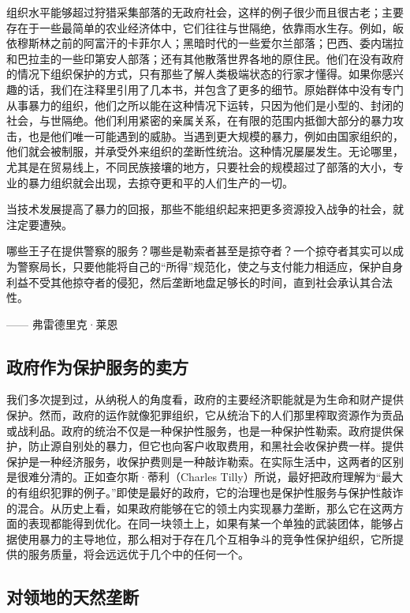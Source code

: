 组织水平能够超过狩猎采集部落的无政府社会，这样的例子很少而且很古老；主要存在于一些最简单的农业经济体中，它们往往与世隔绝，依靠雨水生存。例如，皈依穆斯林之前的阿富汗的卡菲尔人；黑暗时代的一些爱尔兰部落；巴西、委内瑞拉和巴拉圭的一些印第安人部落；还有其他散落世界各地的原住民。他们在没有政府的情况下组织保护的方式，只有那些了解人类极端状态的行家才懂得。如果你感兴趣的话，我们在注释里引用了几本书，并包含了更多的细节。原始群体中没有专门从事暴力的组织，他们之所以能在这种情况下运转，只因为他们是小型的、封闭的社会，与世隔绝。他们利用紧密的亲属关系，在有限的范围内抵御大部分的暴力攻击，也是他们唯一可能遇到的威胁。当遇到更大规模的暴力，例如由国家组织的，他们就会被制服，并承受外来组织的垄断性统治。这种情况屡屡发生。无论哪里，尤其是在贸易线上，不同民族接壤的地方，只要社会的规模超过了部落的大小，专业的暴力组织就会出现，去掠夺更和平的人们生产的一切。

当技术发展提高了暴力的回报，那些不能组织起来把更多资源投入战争的社会，就注定要遭殃。

\begin{tcolorbox}
\kaishu 哪些王子在提供警察的服务？哪些是勒索者甚至是掠夺者？一个掠夺者其实可以成为警察局长，只要他能将自己的“所得”规范化，使之与支付能力相适应，保护自身利益不受其他掠夺者的侵犯，然后垄断地盘足够长的时间，直到社会承认其合法性。
\begin{flushright}
—— 弗雷德里克·莱恩
\end{flushright}
\end{tcolorbox}

\subsection{政府作为保护服务的卖方}
我们多次提到过，从纳税人的角度看，政府的主要经济职能就是为生命和财产提供保护。然而，政府的运作就像犯罪组织，它从统治下的人们那里榨取资源作为贡品或战利品。政府的统治不仅是一种保护性服务，也是一种保护性勒索。政府提供保护，防止源自别处的暴力，但它也向客户收取费用，和黑社会收保护费一样。提供保护是一种经济服务，收保护费则是一种敲诈勒索。在实际生活中，这两者的区别是很难分清的。正如查尔斯·蒂利（Charles Tilly）所说，最好把政府理解为“最大的有组织犯罪的例子。”即使是最好的政府，它的治理也是保护性服务与保护性敲诈的混合。从历史上看，如果政府能够在它的领土内实现暴力垄断，那么它在这两方面的表现都能得到优化。在同一块领土上，如果有某一个单独的武装团体，能够占据使用暴力的主导地位，那么相对于存在几个互相争斗的竞争性保护组织，它所提供的服务质量，将会远远优于几个中的任何一个。

\subsection{对领地的天然垄断}

